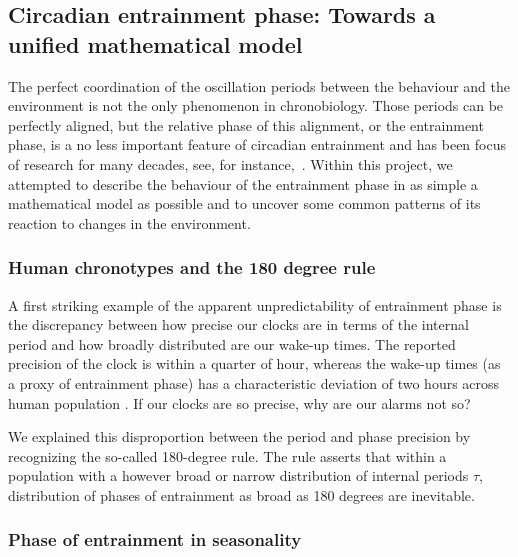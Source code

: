\subsection{Circadian entrainment phase: Towards a unified mathematical
model}

The perfect coordination of the oscillation periods between the
behaviour and the environment is not the only phenomenon in
chronobiology. Those periods can be perfectly aligned, but the
relative phase of this alignment, or the entrainment phase, is a no
less important feature of circadian entrainment and has been focus of
research for many decades, see, for
instance,~\cite{pittendrigh1981circadian}. Within this project, we
attempted to describe the behaviour of the entrainment phase in as
simple a mathematical model as possible and to uncover some common
patterns of its reaction to changes in the environment.

\subsubsection{Human chronotypes and the 180 degree rule}
A first striking example of the apparent unpredictability of
entrainment phase is the discrepancy between how precise our clocks
are in terms of the internal period and how broadly distributed are
our wake-up times. The reported precision of the clock is within a
quarter of hour, whereas the wake-up times (as a proxy of entrainment
phase) has a characteristic deviation of two hours across human
population \cite{duffy2005entrainment}. If our clocks are so precise,
why are our alarms not so?

We explained this disproportion between the period and phase precision
by recognizing the so-called 180-degree rule. The rule asserts that
within a population with a however broad or narrow distribution of
internal periods $\tau$, distribution of phases of entrainment as
broad as 180 degrees are inevitable.


\subsubsection{Phase of entrainment in seasonality}

